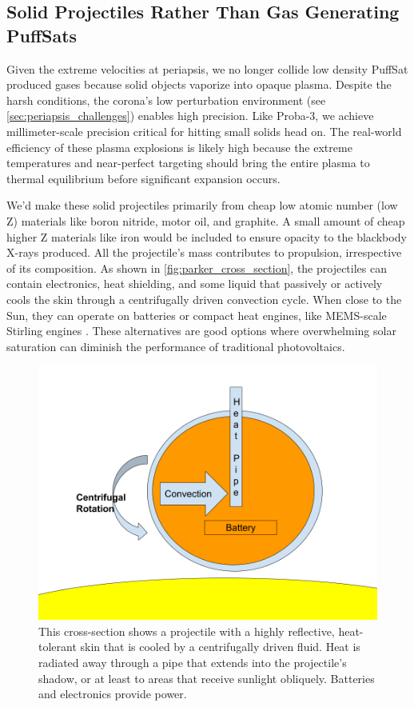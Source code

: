 \documentclass{article}
\begin{document}
{\subsection{Solid Projectiles Rather Than Gas Generating PuffSats}\label{sec:solid_PuffSats}
Given the extreme velocities at periapsis, we no longer collide low density PuffSat produced gases because solid objects vaporize into opaque plasma.   Despite the harsh conditions, the corona's low perturbation environment (see \autoref{sec:periapsis_challenges}) enables high precision.  Like Proba-3, we achieve millimeter-scale precision critical for hitting small solids head on.   The real-world efficiency of these plasma explosions is likely high because the extreme temperatures and near-perfect targeting should bring the entire plasma to thermal equilibrium before significant expansion occurs.

We'd make these solid projectiles primarily from cheap low atomic number (low Z) materials like boron nitride, motor oil, and graphite.  A small amount of cheap higher Z materials like iron would be included to ensure opacity to the blackbody X-rays produced.  
All the projectile's mass contributes to propulsion, irrespective of its composition.  As shown in \autoref{fig:parker_cross_section}, the projectiles can contain electronics, heat shielding, and some liquid that passively or actively cools the skin through a centrifugally driven convection cycle.    When close to the Sun, they can operate on batteries or compact heat engines, like MEMS-scale Stirling engines \cite{mems_stirling_engine}. These alternatives are good options  where overwhelming solar saturation can diminish the performance of traditional photovoltaics.    

\begin{figure}
    \centering
    \includegraphics[width=0.5\linewidth]{images/Parker Projectile Cross Section.png}
    \caption{This cross-section shows a projectile with a highly reflective, heat-tolerant skin that is cooled by a centrifugally driven fluid. Heat is radiated away through a pipe that extends into the projectile's shadow, or at least to areas that receive sunlight obliquely. Batteries and electronics provide power.}
    \label{fig:parker_cross_section}
\end{figure}

}
\end{document}
